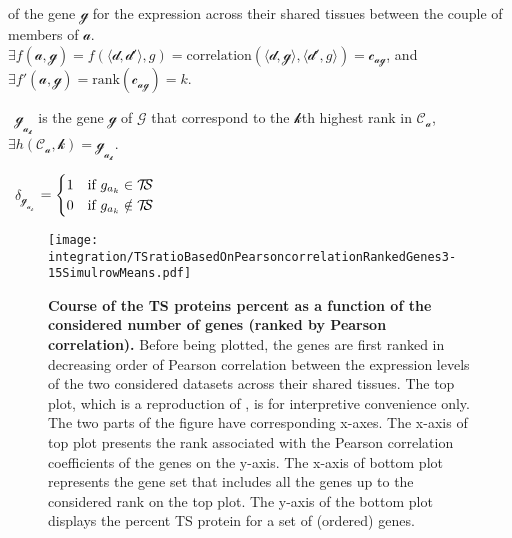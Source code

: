 \begin{eqlist}[\setlength{\itemsep}{0em}%
         \setlength{\topsep}{0em}%
         \setlength{\partopsep}{0em}%
         \setlength{\parskip}{0em}%
         \setlength{\parsep}{0em}]
             of the gene $\mathcal{g}$
             for the expression across their shared tissues between
             the couple of members of $\mathcal{a}$.\\
             $\exists f(\mathcal{a,g})= f(\langle\mathcal{d,d'}\rangle,g)=
             \text{correlation}(\langle\mathcal{d,g}\rangle,%
             \langle\mathcal{d'},g\rangle)=\mathcal{c_{ag}}$, and\\
             $\exists f'(\mathcal{a,g})=\text{rank}(\mathcal{c_{ag}})=k$.
         \item[\textbullet\ $\mathcal{g_{a_{k}}}$] is the gene $\mathcal{g}$ of $\mathcal{G}$
             that correspond to the $\mathcal{k}$th highest rank in $\mathcal{C_a}$,\\
             $\exists h(\mathcal{C_{a},k})=\mathcal{g_{a_{k}}}$.
         \item[\textbullet\ $\delta_{\mathcal{g}_{\mathcal{a_{k}}}}$]$=\begin{cases}
                 1 & \text{if $g_{a_{k}} \in \TSm$}\\
                 0 & \text{if $g_{a_{k}} \notin \TSm$}
 \end{cases}       $
 \end{eqlist}

\begin{figure}[!ht]
    \texttt{[image: integration/TSratioBasedOnPearsoncorrelationRankedGenes3-15SimulrowMeans.pdf]}\centering
    \vspace{-3mm}
    \caption[Course of the TS proteins percent as a function of
    the considered number of genes (ranked by Pearson correlation)]{\label{fig:Spe_Cor}%
    \textbf{Course of the TS proteins percent as a function of the considered
    number of genes (ranked by Pearson correlation).}
    Before being plotted,
    the genes are first ranked in decreasing order of Pearson correlation
    between the expression levels of the two considered datasets
    across their shared tissues.
    The top plot, which is a reproduction of ,
    is for interpretive convenience only.
    The two parts of the figure have corresponding x-axes.
    The x-axis of top plot presents the rank associated with
    the Pearson correlation coefficients of the genes on the y-axis.
    The x-axis of bottom plot represents the gene set that includes
    all the genes up to the considered rank on the top plot.
    The y-axis of the bottom plot displays the percent TS protein
    for a set of (ordered) genes.
    }
\end{figure}

